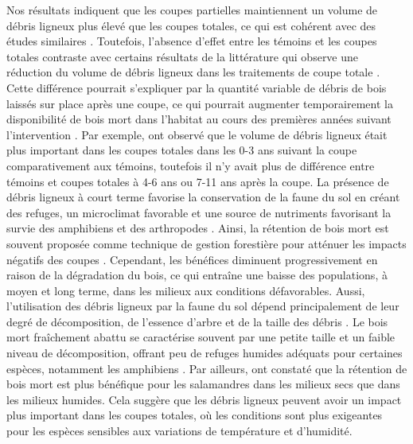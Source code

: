 Nos résultats indiquent que les coupes partielles maintiennent un volume de débris ligneux plus élevé que les coupes totales, ce qui est cohérent avec des études similaires \citep{Nolet2018Comparingeffects,Ochs2022Responseterrestrial}. 
Toutefois, l’absence d'effet entre les témoins et les coupes totales contraste avec certains résultats de la littérature qui observe une réduction du volume de débris ligneux dans les traitements de coupe totale \citep{Mazerolle2021Woodlandsalamander}.
Cette différence pourrait s'expliquer par la quantité variable de débris de bois laissés sur place après une coupe, ce qui pourrait augmenter temporairement la disponibilité de bois mort dans l'habitat au cours des premières années suivant l'intervention \citep{McCarthy1994Distributionabundance}. 
Par exemple, \cite{Ochs2022Responseterrestrial} ont observé que le volume de débris ligneux était plus important dans les coupes totales dans les 0-3 ans suivant la coupe comparativement aux témoins, 
toutefois il n’y avait plus de différence entre témoins et coupes totales à 4-6 ans ou 7-11 ans après la coupe. 
La présence de débris ligneux à court terme favorise la conservation de la faune du sol en créant des refuges, un microclimat favorable et une source de nutriments favorisant la survie des amphibiens et des arthropodes \citep{Spotila1972Roletemperature,Huhta1976Effectsclearcutting,Seibold2021contributioninsects,Ochs2022Responseterrestrial}. 
Ainsi, la rétention de bois mort est souvent proposée comme technique de gestion forestière pour atténuer les impacts négatifs des coupes \citep{McKenny2006Effectsstructural}. 
Cependant, les bénéfices diminuent progressivement en raison de la dégradation du bois, ce qui entraîne une baisse des populations, à moyen et long terme, dans les milieux aux conditions défavorables. 
Aussi, l’utilisation des débris ligneux par la faune du sol dépend principalement de leur degré de décomposition, de l’essence d’arbre et de la taille des débris \citep{Bunnell2010woodbiodiversity}. 
Le bois mort fraîchement abattu se caractérise souvent par une petite taille et un faible niveau de décomposition, offrant peu de refuges humides adéquats pour certaines espèces, notamment les amphibiens \citep{Petranka1994Effectstimber,Morneault2004effectshelterwood,Owens2008Amphibianreptile,Otto2013Amphibianresponse}. 
Par ailleurs, \cite{Petranka1994Effectstimber} ont constaté que la rétention de bois mort est plus bénéfique pour les salamandres dans les milieux secs que dans les milieux humides. 
Cela suggère que les débris ligneux peuvent avoir un impact plus important dans les coupes totales, où les conditions sont plus exigeantes pour les espèces sensibles aux variations de température et d’humidité.

